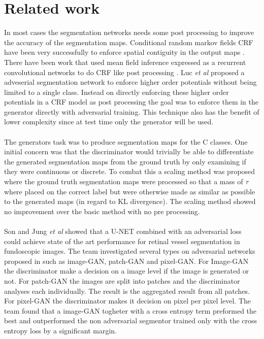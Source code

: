 \documentclass[a4paper,11pt]{article}
\begin{document}
\section{Related work}
In most cases the segmentation networks needs some post processing to improve the accuracy of the segmentation maps. Conditional random markov fields CRF have been very successfully to enforce spatial contiguity in the output maps \cite{arnab_higher_2015, luc_semantic_2016}. There have been work that used mean field inference expressed as a recurrent convolutional networks to do CRF like post processing \cite{schwing_fully_2015, zheng_conditional_2015}. Luc \textit{et al} \cite{luc_semantic_2016} proposed a adveserial segmentation network to enforce higher order potentials without being limited to a single class. Instead on directly enforcing these higher order potentials in a CRF model as post processing the goal was to enforce them in the generator directly with adversarial training. This technique also has the benefit of lower complexity since at test time only the generator will be used.\\
\\
The generators task was to produce segmentation maps for the C classes. One initial concern was that the discriminator would trivially be able to differentiate the generated segmentation maps from the ground truth by only examining if they were continuous or discrete. To combat this a scaling method was proposed where the ground truth segmentation maps were processed so that a mass of $\tau$ where placed on the correct label but were otherwise made as similar as possible to the generated maps (in regard to KL divergence). The scaling method showed no improvement over the basic method with no pre processing.\\
\\
Son and Jung \textit{et al} \cite{son_retinal_2017} showed that a U-NET combined with an adversarial loss could achieve state of the art performance for retinal vessel segmentation in fundoscopic images. The team investigated several types on adversarial networks proposed in \cite{isola_image--image_2016} such as image-GAN, patch-GAN and pixel-GAN. For Image-GAN the discriminator make a decision on a image level if the image is generated or not. For patch-GAN the images are split into patches and the discriminator analyses each individually. The result is the aggregated result from all patches. For pixel-GAN the discriminator makes it decision on pixel per pixel level. The team found that a image-GAN togheter with a cross entropy term preformed the best and outperformed the non adversarial segmentor trained only with the cross entropy loss by a significant margin.\\
\\
\end{document}
